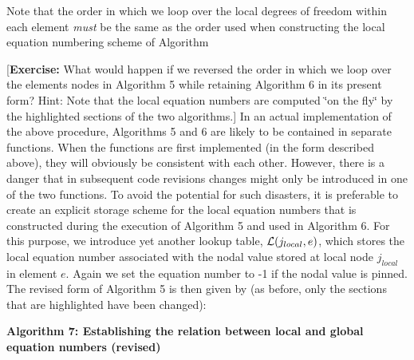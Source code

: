 Note that the order in which we loop over the local degrees of freedom within each element {\itshape must} be the same as the order used when constructing the local equation numbering scheme of Algorithm
\begin{DoxyEnumerate}
\item \mbox{[}{\bfseries Exercise\+:} What would happen if we reversed the order in which we loop over the element\textquotesingle{}s nodes in Algorithm 5 while retaining Algorithm 6 in its present form? Hint\+: Note that the local equation numbers are computed \char`\"{}on the fly\char`\"{} by the highlighted sections of the two algorithms.\mbox{]} In an actual implementation of the above procedure, Algorithms 5 and 6 are likely to be contained in separate functions. When the functions are first implemented (in the form described above), they will obviously be consistent with each other. However, there is a danger that in subsequent code revisions changes might only be introduced in one of the two functions. To avoid the potential for such disasters, it is preferable to create an explicit storage scheme for the local equation numbers that is constructed during the execution of Algorithm 5 and used in Algorithm 6. For this purpose, we introduce yet another lookup table, $ {\cal L}(j_{local},e)$, which stores the local equation number associated with the nodal value stored at local node $ j_{local}$ in element $e$. Again we set the equation number to -\/1 if the nodal value is pinned. The revised form of Algorithm 5 is then given by (as before, only the sections that are highlighted have been changed)\+:

\begin{center} {\bfseries  Algorithm 7\+: Establishing the relation between local and global equation numbers (revised) } \end{center} 
\end{DoxyEnumerate}
